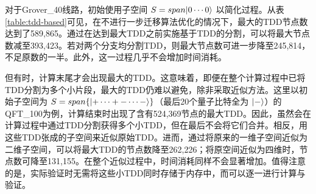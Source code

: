 对于Grover\_40线路，初始使用子空间 $S=span{\ket{0\cdots0}}$ 以简化过程。从表\ref{table:tdd-based}可见，在不进行一步迁移算法优化的情况下，最大的TDD节点数达到了589,865。通过在达到最大TDD之前实施基于TDD的分割，可以将最大节点数减至393,423。若对两个分支均分割TDD，则最大节点数可进一步降至245,814，不足原数的一半。此外，这一过程几乎不会增加时间消耗。
    
但有时，计算末尾才会出现最大的TDD。这意味着，即便在整个计算过程中已将TDD分割为多个小片段，最大的TDD仍难以避免，除非采取近似方法。这里以初始子空间为 $S=span\{\ket{+\cdots+ -\cdots -}\}$（最后20个量子比特全为 $\ket{-}$）的QFT\_100为例，计算结束时出现了含有524,369节点的最大TDD。因此，虽然会在计算过程中通过TDD分割获得多个小TDD，但在最后不会将它们合并。相反，用这些TDD张成的子空间来近似原始TDD。进而，通过将原来的一维子空间近似为二维子空间，可以将最大TDD的节点数降至262,226；将原空间近似为四维时，节点数可降至131,155。在整个近似过程中，时间消耗同样不会显著增加。值得注意的是，实际验证时无需将这些小TDD同时存储于内存中，而可以逐一进行计算与验证。

\begin{table}[]
    
    \caption{TDD拆分与近似的优化方案}

    \label{table:tdd-based}
    \centering
\end{table}

